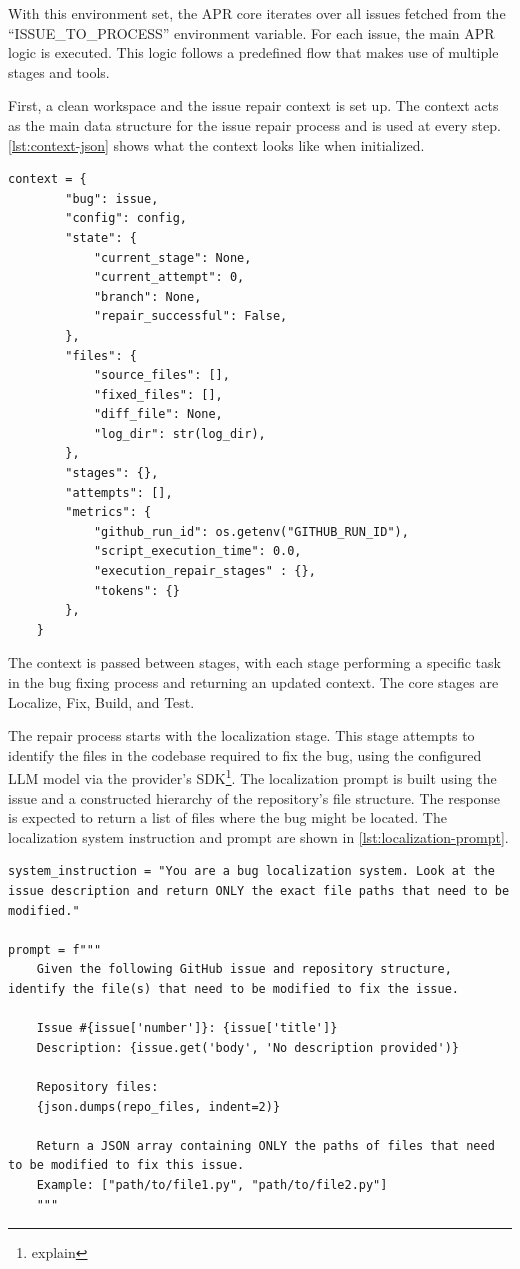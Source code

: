 With this environment set, the APR core iterates over all issues fetched from the ``ISSUE\_TO\_PROCESS'' environment variable. For each issue, the main APR logic is executed. This logic follows a predefined flow that makes use of multiple stages and tools.

First, a clean workspace and the issue repair context is set up. The context acts as the main data structure for the issue repair process and is used at every step. \ref{lst:context-json} shows what the context looks like when initialized.

\begin{lstlisting}[caption={Context JSON}, label={lst:context-json}]  
    context = {
        "bug": issue,
        "config": config,
        "state": {
            "current_stage": None,
            "current_attempt": 0,
            "branch": None,
            "repair_successful": False,
        },
        "files": {
            "source_files": [],
            "fixed_files": [],
            "diff_file": None,
            "log_dir": str(log_dir),
        },
        "stages": {},
        "attempts": [],
        "metrics": {
            "github_run_id": os.getenv("GITHUB_RUN_ID"),
            "script_execution_time": 0.0,
            "execution_repair_stages" : {},
            "tokens": {}
        },
    }
\end{lstlisting}

The context is passed between stages, with each stage performing a specific task in the bug fixing process and returning an updated context. The core stages are Localize, Fix, Build, and Test.

The repair process starts with the localization stage. This stage attempts to identify the files in the codebase required to fix the bug, using the configured LLM model via the provider's SDK\footnote{explain}. The localization prompt is built using the issue and a constructed hierarchy of the repository's file structure. The response is expected to return a list of files where the bug might be located. The localization system instruction and prompt are shown in \ref{lst:localization-prompt}.

\begin{lstlisting}[caption={Localization Prompt}, label={lst:localization-prompt}]
system_instruction = "You are a bug localization system. Look at the issue description and return ONLY the exact file paths that need to be modified."

prompt = f"""
    Given the following GitHub issue and repository structure, identify the file(s) that need to be modified to fix the issue.

    Issue #{issue['number']}: {issue['title']}
    Description: {issue.get('body', 'No description provided')}

    Repository files:
    {json.dumps(repo_files, indent=2)}

    Return a JSON array containing ONLY the paths of files that need to be modified to fix this issue.
    Example: ["path/to/file1.py", "path/to/file2.py"]
    """
\end{lstlisting}

